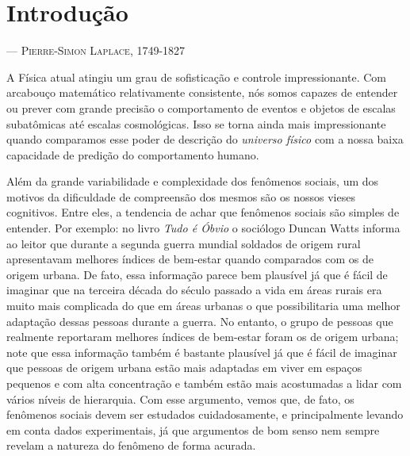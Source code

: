 \chapter{Introdução}

\begin{epigraphs}
{\---- \textsc{Pierre-Simon Laplace, 1749-1827}}
\end{epigraphs}

A Física atual atingiu um grau de sofisticação e controle
impressionante. Com arcabouço matemático relativamente consistente, nós
somos capazes de entender ou prever com grande precisão o comportamento de
eventos e objetos de escalas subatômicas até escalas cosmológicas. Isso se
torna ainda mais impressionante quando comparamos esse poder de descrição
do \textit{universo físico} com a nossa baixa capacidade de predição do
comportamento humano.

Além da grande variabilidade e complexidade dos fenômenos sociais,
um dos motivos da dificuldade de compreensão dos mesmos são os nossos
vieses cognitivos. Entre eles, a tendencia de achar que fenômenos
sociais são simples de entender. Por exemplo: no livro \textit{Tudo
é Óbvio}\cite{Watts2011} o sociólogo Duncan Watts informa ao leitor que
durante a segunda guerra mundial soldados de origem rural apresentavam melhores
índices de bem-estar quando comparados com os de origem urbana. De fato,
essa informação parece bem plausível já que é fácil de imaginar que
na terceira década do século passado a vida em áreas rurais era muito
mais complicada do que em áreas urbanas o que possibilitaria uma melhor
adaptação dessas pessoas durante a guerra. No entanto, o grupo de pessoas
que realmente reportaram melhores índices de bem-estar foram os de origem
urbana; note que essa informação também é bastante plausível já que
é fácil de imaginar que pessoas de origem urbana estão mais adaptadas em
viver em espaços pequenos e com alta concentração e também estão mais
acostumadas a lidar com vários níveis de hierarquia. Com esse argumento,
vemos que, de fato, os fenômenos sociais devem ser estudados cuidadosamente,
e principalmente levando em conta dados experimentais, já que argumentos
de bom senso nem sempre revelam a natureza do fenômeno de forma acurada.

